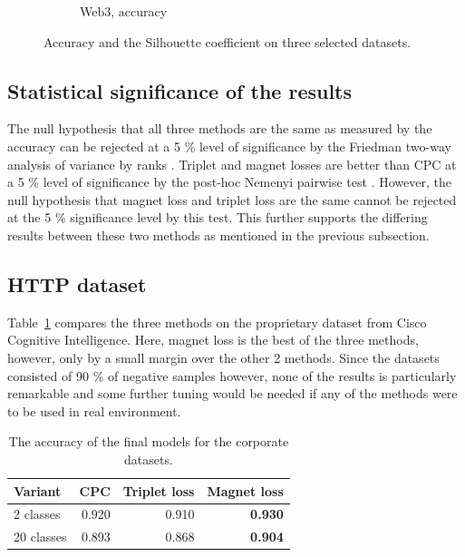 \begin{figure}
\begin{subfigure}[t]{0.49\textwidth}
    \caption{Web3, accuracy}
  \end{subfigure}
  \caption{Accuracy and the Silhouette coefficient on three selected datasets.}\label{fig:public-comparison}
\end{figure}

\subsection{Statistical significance of the results}

The null hypothesis that all three methods are the same as measured by the accuracy can be rejected at a 5 \% level of significance by the Friedman two-way analysis of variance by ranks \cite{friedman_use_1937}. Triplet and magnet losses are better than CPC at a 5 \% level of significance by the post-hoc Nemenyi pairwise test \cite{nemenyi_distribution-free_1963}. However, the null hypothesis that magnet loss and triplet loss are the same cannot be rejected at the 5 \% significance level by this test. This further supports the differing results between these two methods as mentioned in the previous subsection.

\subsection{HTTP dataset}

Table~\ref{tab:cisco-accuracy} compares the three methods on the proprietary dataset from Cisco Cognitive Intelligence. Here, magnet loss is the best of the three methods, however, only by a small margin over the other 2 methods. Since the datasets consisted of 90 \% of negative samples however, none of the results is particularly remarkable and some further tuning would be needed if any of the methods were to be used in real environment.

\begin{table}
  \centering
  \begin{tabular}{lrrr}
    \toprule
    Variant    & CPC   & Triplet loss & Magnet loss \\
    \midrule
    2 classes  & 0.920 & 0.910        & \textbf{0.930} \\
    20 classes & 0.893 & 0.868        & \textbf{0.904} \\
    \bottomrule
  \end{tabular}
  \caption{The accuracy of the final models for the corporate datasets.}\label{tab:cisco-accuracy}
\end{table}
